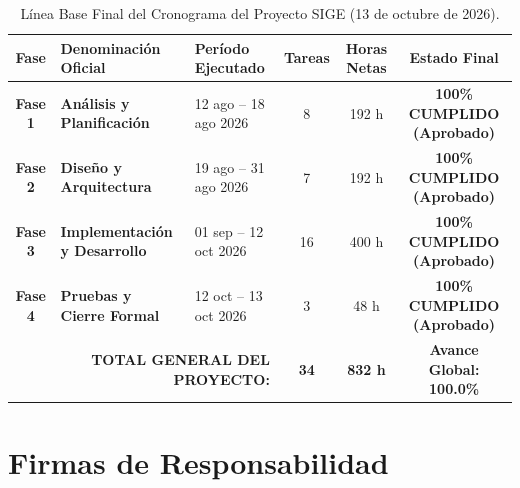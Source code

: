 \documentclass[12pt,a4paper]{article}
\begin{document}
\begin{table}[H]
\centering
\small
\renewcommand{\arraystretch}{1.2}
\begin{tabularx}{\textwidth}{|c|>{\raggedright\arraybackslash\bfseries}m{3.2cm}|m{2.5cm}|c|c|c|}
\hline
\rowcolor{tableheader}
\textbf{Fase} & \textbf{Denominación Oficial} & \textbf{Período Ejecutado} & \textbf{Tareas} & \textbf{Horas Netas} & \textbf{Estado Final} \\
\hline
\textbf{Fase 1} & Análisis y Planificación & 12 ago -- 18 ago 2026 & 8 & 192 h & \textbf{100\% CUMPLIDO (Aprobado)} \\
\hline
\textbf{Fase 2} & Diseño y Arquitectura & 19 ago -- 31 ago 2026 & 7 & 192 h & \textbf{100\% CUMPLIDO (Aprobado)} \\
\hline
\textbf{Fase 3} & Implementación y Desarrollo & 01 sep -- 12 oct 2026 & 16 & 400 h & \textbf{100\% CUMPLIDO (Aprobado)} \\
\hline
\textbf{Fase 4} & Pruebas y Cierre Formal & 12 oct -- 13 oct 2026 & 3 & 48 h & \textbf{100\% CUMPLIDO (Aprobado)} \\
\hline
\multicolumn{3}{|r|}{\textbf{TOTAL GENERAL DEL PROYECTO:}} & \textbf{34} & \textbf{832 h} & \textbf{Avance Global: 100.0\%} \\
\hline
\end{tabularx}
\caption{Línea Base Final del Cronograma del Proyecto SIGE (13 de octubre de 2026).}
\label{tab:linea_base_final}
\end{table}

\section{Firmas de Responsabilidad}
\end{document}
